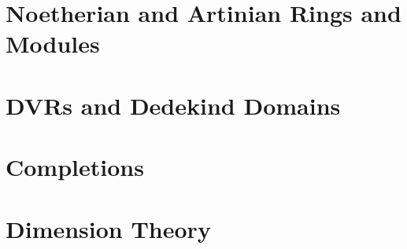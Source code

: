 \documentclass[oneside]{report}
\begin{document}
\chapter{Noetherian and Artinian Rings and Modules}


\chapter{DVRs and Dedekind Domains}


\chapter{Completions}


\chapter{Dimension Theory}




\end{document}
